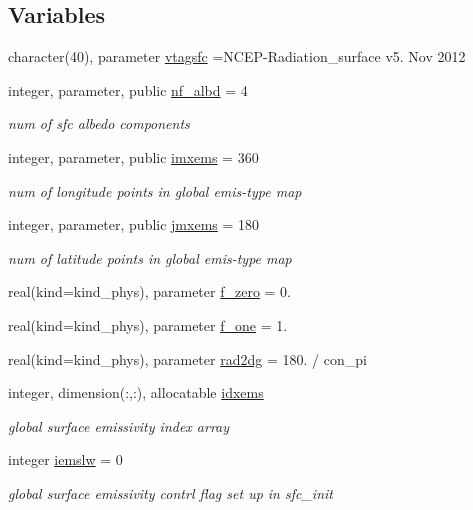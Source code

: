 \subsection*{Variables}
\begin{DoxyCompactItemize}
\item 
character(40), parameter \hyperlink{namespacemodule__radiation__surface_ab0b8c10a0fb6be2644fdf91e3fe1fc5c}{vtagsfc} =\textquotesingle{}N\+C\+EP-\/Radiation\+\_\+surface v5. Nov 2012 \textquotesingle{}
\item 
integer, parameter, public \hyperlink{group__module__radiation__surface_gab7800982c900bd632ca74d5e7d2b5ab3}{nf\+\_\+albd} = 4
\begin{DoxyCompactList}\small\item\em num of sfc albedo components \end{DoxyCompactList}\item 
integer, parameter, public \hyperlink{group__module__radiation__surface_gaab4b9853c71ff40f8db2aa78b7cab265}{imxems} = 360
\begin{DoxyCompactList}\small\item\em num of longitude points in global emis-\/type map \end{DoxyCompactList}\item 
integer, parameter, public \hyperlink{group__module__radiation__surface_ga3922674f1c727d517ba5b0f7f5093970}{jmxems} = 180
\begin{DoxyCompactList}\small\item\em num of latitude points in global emis-\/type map \end{DoxyCompactList}\item 
real(kind=kind\+\_\+phys), parameter \hyperlink{group__module__radiation__surface_ga86e4f42e46e188303b9a8e4d503d1acb}{f\+\_\+zero} = 0.
\item 
real(kind=kind\+\_\+phys), parameter \hyperlink{group__module__radiation__surface_ga91cec823f595387c92d659d89f307f42}{f\+\_\+one} = 1.
\item 
real(kind=kind\+\_\+phys), parameter \hyperlink{group__module__radiation__surface_gab879c7cf4e0774089a626e54226e4c1b}{rad2dg} = 180. / con\+\_\+pi
\item 
integer, dimension(\+:,\+:), allocatable \hyperlink{group__module__radiation__surface_gac33f1f3441f8336d7eb7e15cba26caf7}{idxems}
\begin{DoxyCompactList}\small\item\em global surface emissivity index array \end{DoxyCompactList}\item 
integer \hyperlink{group__module__radiation__surface_ga3ceebb99dbffcb70a14cfcaa7b029abc}{iemslw} = 0
\begin{DoxyCompactList}\small\item\em global surface emissivity contrl flag set up in \textquotesingle{}sfc\+\_\+init\textquotesingle{} \end{DoxyCompactList}\end{DoxyCompactItemize}


